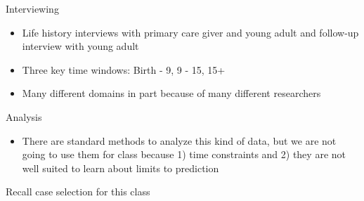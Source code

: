 \documentclass[aspectratio=169]{beamer}
\begin{document}
\begin{frame}
\begin{center}
\end{center}

\end{frame}
\begin{frame}

\begin{center}
{\Large Interviewing}
\end{center}

\end{frame}
\begin{frame}

\begin{itemize}
\item Life history interviews with primary care giver and young adult and follow-up interview with young adult
\pause
\item Three key time windows: Birth - 9, 9 - 15, 15+
\pause
\item Many different domains in part because of many different researchers
\end{itemize}

\end{frame}
\begin{frame}

\begin{center}
{\Large Analysis}
\end{center}

\end{frame}
\begin{frame}

\begin{itemize}
\item There are standard methods to analyze this kind of data, but we are not going to use them for class because 1) time constraints and 2) they are not well suited to learn about limits to prediction 
\end{itemize}

\end{frame}
\begin{frame}

\begin{center}
{\Large Recall case selection for this class}
\end{center}

\end{frame}
\end{document}
